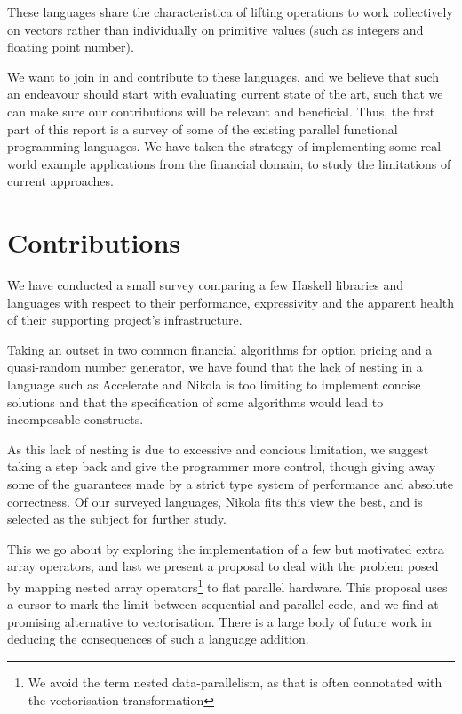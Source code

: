 These languages share the characteristica of lifting operations to
work collectively on vectors rather than individually on primitive
values (such as integers and floating point number).

We want to join in and contribute to these languages, and we believe
that such an endeavour should start with evaluating current state of
the art, such that we can make sure our contributions will be relevant
and beneficial. Thus, the first part of this report is a survey of
some of the existing parallel functional programming languages. We
have taken the strategy of implementing some real world example
applications from the financial domain, to study the limitations of
current approaches.


\section{Contributions}

We have conducted a small survey comparing a few Haskell libraries and
languages with respect to their performance, expressivity and the apparent
health of their supporting project's infrastructure.

Taking an outset in two common financial algorithms for option pricing
and a quasi-random number generator, we have found that the lack of
nesting in a language such as Accelerate and Nikola is too limiting to
implement concise solutions and that the specification of some
algorithms would lead to incomposable constructs.

As this lack of nesting is due to excessive and concious limitation,
we suggest taking a step back and give the programmer more control,
though giving away some of the guarantees made by a strict type system
of performance and absolute correctness. Of our surveyed languages,
Nikola fits this view the best, and is selected as the subject for
further study.

This we go about by exploring the implementation of a few but
motivated extra array operators, and last we present a proposal to
deal with the problem posed by mapping nested array
operators\footnote{We avoid the term nested data-parallelism, as that
  is often connotated with the vectorisation transformation} to flat
parallel hardware. This proposal uses a cursor to mark the limit
between sequential and parallel code, and we find at promising
alternative to vectorisation. There is a large body of future work in
deducing the consequences of such a language addition.

